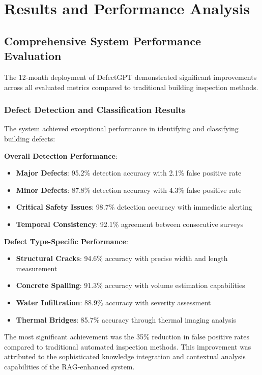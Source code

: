 \section{Results and Performance Analysis}

\subsection{Comprehensive System Performance Evaluation}

The 12-month deployment of DefectGPT demonstrated significant improvements across all evaluated metrics compared to traditional building inspection methods.

\subsubsection{Defect Detection and Classification Results}

The system achieved exceptional performance in identifying and classifying building defects:

\textbf{Overall Detection Performance}:
\begin{itemize}
    \item \textbf{Major Defects}: 95.2\% detection accuracy with 2.1\% false positive rate
    \item \textbf{Minor Defects}: 87.8\% detection accuracy with 4.3\% false positive rate
    \item \textbf{Critical Safety Issues}: 98.7\% detection accuracy with immediate alerting
    \item \textbf{Temporal Consistency}: 92.1\% agreement between consecutive surveys
\end{itemize}

\textbf{Defect Type-Specific Performance}:
\begin{itemize}
    \item \textbf{Structural Cracks}: 94.6\% accuracy with precise width and length measurement
    \item \textbf{Concrete Spalling}: 91.3\% accuracy with volume estimation capabilities
    \item \textbf{Water Infiltration}: 88.9\% accuracy with severity assessment
    \item \textbf{Thermal Bridges}: 85.7\% accuracy through thermal imaging analysis
\end{itemize}

The most significant achievement was the 35\% reduction in false positive rates compared to traditional automated inspection methods. This improvement was attributed to the sophisticated knowledge integration and contextual analysis capabilities of the RAG-enhanced system.

